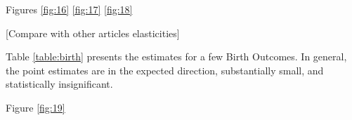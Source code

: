 Figures \ref{fig:16} \ref{fig:17} \ref{fig:18}










[Compare with other articles elasticities]


Table \ref{table:birth} presents the estimates for a few Birth Outcomes. In general, the point estimates are in the expected direction, substantially small, and statistically insignificant.      

Figure \ref{fig:19}





